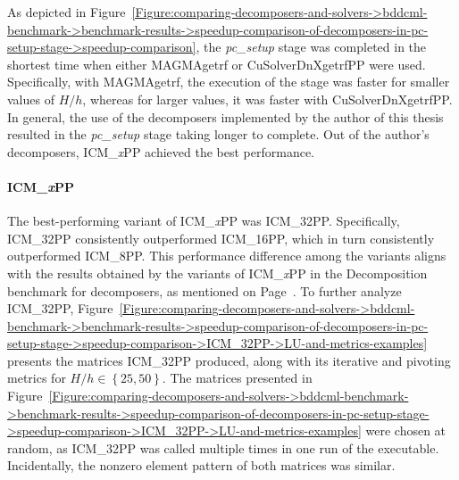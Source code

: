 As depicted in Figure~\ref{Figure:comparing-decomposers-and-solvers->bddcml-benchmark->benchmark-results->speedup-comparison-of-decomposers-in-pc-setup-stage->speedup-comparison}, the \textit{pc\_setup} stage was completed in the shortest time when either MAGMAgetrf or CuSolverDnXgetrfPP were used. Specifically, with MAGMAgetrf, the execution of the stage was faster for smaller values of $H/h$, whereas for larger values, it was faster with CuSolverDnXgetrfPP. In general, the use of the decomposers implemented by the author of this thesis resulted in the \textit{pc\_setup} stage taking longer to complete. Out of the author's decomposers, ICM\_\textit{x}PP achieved the best performance.

\paragraph{ICM\_\textit{x}PP} The best-performing variant of ICM\_\textit{x}PP was ICM\_32PP. Specifically, ICM\_32PP consistently outperformed ICM\_16PP, which in turn consistently outperformed ICM\_8PP. This performance difference among the variants aligns with the results obtained by the variants of ICM\_\textit{x}PP in the Decomposition benchmark for decomposers, as mentioned on Page~\pageref{Text:comparing-decomposers-and-solvers->decomposition-project-benchmarks->decomposers-benchmark->comparison-of-execution-times-on-subset-of-matrices->ICMxPP->performance-of-variants}. To further analyze ICM\_32PP, Figure~\ref{Figure:comparing-decomposers-and-solvers->bddcml-benchmark->benchmark-results->speedup-comparison-of-decomposers-in-pc-setup-stage->speedup-comparison->ICM_32PP->LU-and-metrics-examples} presents the  matrices ICM\_32PP produced, along with its iterative and pivoting metrics for $H/h \in \left\{25, 50\right\}$. The matrices presented in Figure~\ref{Figure:comparing-decomposers-and-solvers->bddcml-benchmark->benchmark-results->speedup-comparison-of-decomposers-in-pc-setup-stage->speedup-comparison->ICM_32PP->LU-and-metrics-examples} were chosen at random, as ICM\_32PP was called multiple times in one run of the  executable. Incidentally, the nonzero element pattern of both matrices was similar.

